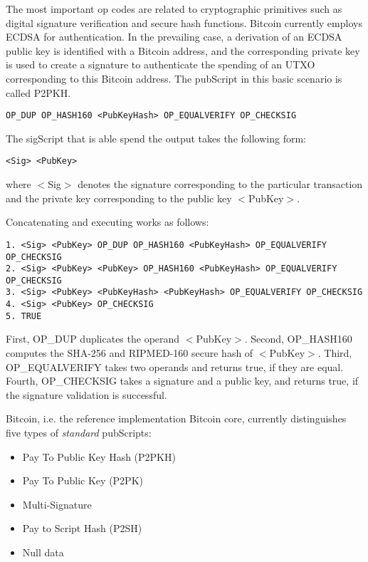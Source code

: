 The most important op codes are related to cryptographic primitives such as digital signature verification and secure hash functions. Bitcoin currently employs \ac{ECDSA} for authentication. In the prevailing case, a derivation of an \ac{ECDSA} public key is identified with a Bitcoin address, and the corresponding private key is used to create a signature to authenticate the spending of an \ac{UTXO} corresponding to this Bitcoin address. 
The pubScript in this basic scenario is called \ac{P2PKH}.

\begin{lstlisting}
OP_DUP OP_HASH160 <PubKeyHash> OP_EQUALVERIFY OP_CHECKSIG
\end{lstlisting}

The sigScript that is able spend the output takes the following form:

\begin{lstlisting}
<Sig> <PubKey>
\end{lstlisting}

where $<$Sig$>$ denotes the signature corresponding to the particular transaction and the private key corresponding to the public key $<$PubKey$>$.

Concatenating and executing works as follows:

\begin{lstlisting}[breaklines]
1. <Sig> <PubKey> OP_DUP OP_HASH160 <PubKeyHash> OP_EQUALVERIFY OP_CHECKSIG
2. <Sig> <PubKey> <PubKey> OP_HASH160 <PubKeyHash> OP_EQUALVERIFY OP_CHECKSIG
3. <Sig> <PubKey> <PubKeyHash> <PubKeyHash> OP_EQUALVERIFY OP_CHECKSIG
4. <Sig> <PubKey> OP_CHECKSIG
5. TRUE
\end{lstlisting}

First, OP\_DUP duplicates the operand $<$PubKey$>$. Second, OP\_HASH160 computes the SHA-256 and RIPMED-160 secure hash of $<$PubKey$>$. Third, OP\_EQUALVERIFY takes two operands and returns true, if they are equal. Fourth, OP\_CHECKSIG takes a signature and a public key, and returns true, if the signature validation is successful. 

Bitcoin, i.e. the reference implementation Bitcoin core, currently distinguishes five types of \emph{standard} pubScripts:

\begin{itemize}
\item Pay To Public Key Hash (P2PKH)
\item Pay To Public Key (P2PK)
\item Multi-Signature 
\item Pay to Script Hash (P2SH)
\item Null data
\end{itemize}

